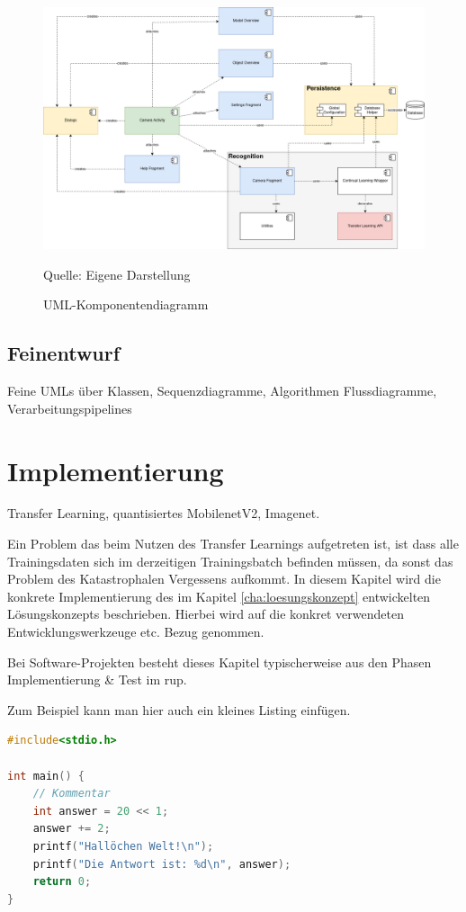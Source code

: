\documentclass[oneside]{ausarbeitung}
\begin{document}
\begin{figure}[hptb]
	\centering
	\includegraphics[height=0.5\textheight]{images/building-block-view.png}
	\caption{UML-Komponentendiagramm} Quelle: Eigene Darstellung
	\label{fig:component-diagram}
\end{figure}

\section{Feinentwurf}
Feine UMLs über Klassen, Sequenzdiagramme, Algorithmen Flussdiagramme, Verarbeitungspipelines

\chapter{Implementierung}
\label{cha:implementierung}
Transfer Learning, quantisiertes MobilenetV2, Imagenet. 

Ein Problem das beim Nutzen des Transfer Learnings aufgetreten ist, ist dass alle Trainingsdaten sich im derzeitigen Trainingsbatch befinden müssen, da sonst das Problem des Katastrophalen Vergessens aufkommt.
In diesem Kapitel wird die konkrete Implementierung des im Kapitel
\ref{cha:loesungskonzept} entwickelten Lösungskonzepts beschrieben.
Hierbei wird auf die konkret verwendeten Entwicklungswerkzeuge etc. 
Bezug genommen.

Bei Software-Projekten besteht dieses Kapitel typischerweise aus den 
Phasen Implementierung \& Test im \ac{rup}.

Zum Beispiel kann man hier auch ein kleines Listing einfügen.

\begin{lstlisting}[language=c,%
                   caption={Überschrift des Quelltexts}]
#include<stdio.h>

int main() {
    // Kommentar
    int answer = 20 << 1;
    answer += 2;
    printf("Hallöchen Welt!\n");
    printf("Die Antwort ist: %d\n", answer);
    return 0;
}
\end{lstlisting}
\end{document}
